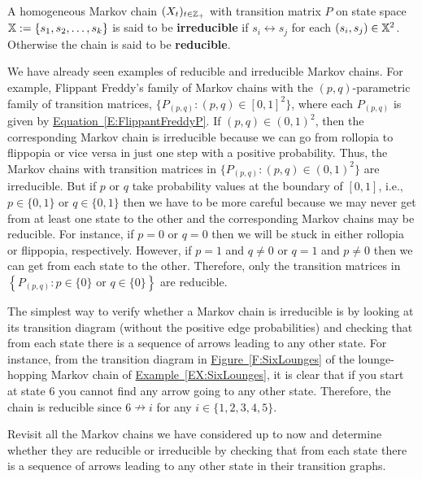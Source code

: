 \begin{definition}[Irreducible]\label{D:Irreducible}
A homogeneous Markov chain $(X_t)_{t\in\mathbb{Z}_+}$ with transition matrix $P$ on state space $\mathbb{X}:=\{s_1,s_2,\ldots,s_k\}$ is said to be {\bf irreducible} if $s_i \leftrightarrow s_j$ for each $(s_i,s_j) \in \mathbb{X}^2$.  Otherwise the chain is said to be {\bf reducible}.
\end{definition}

We have already seen examples of reducible and irreducible Markov chains.  For example, Flippant Freddy's family of Markov chains with the $(p,q)$-parametric family of transition matrices, $\{P_{(p,q)} : (p,q) \in [0,1]^2\}$, where each $P_{(p,q)}$ is given by \hyperref[E:FlippantFreddyP]{Equation~\ref*{E:FlippantFreddyP}}.  If $(p,q) \in (0,1)^2$, then the corresponding Markov chain is irreducible because we can go from rollopia to flippopia or vice versa in just one step with a positive probability.  Thus, the Markov chains with transition matrices in $\{P_{(p,q)} : (p,q) \in (0,1)^2\}$ are irreducible.  But if $p$ or $q$ take probability values at the boundary of $[0,1]$, i.e., $p \in \{0,1\}$ or $q \in \{0,1\}$ then we have to be more careful because we may  never get from at least one state to the other and the corresponding Markov chains may be reducible.   For instance, if $p=0$ or $q=0$ then we will be stuck in either rollopia or flippopia, respectively.  However, if $p=1$ and $q \neq 0$ or $q=1$ and $p \neq 0$ then we can get from each  state to the other.  Therefore,  only the transition matrices in $\left\{P_{(p,q)} : p \in \{0\} \text{ or } q \in \{0\}\right\}$ are reducible.

The simplest way to verify whether a Markov chain is irreducible is by looking at its transition diagram (without the positive edge probabilities) and checking that from each state there is a sequence of arrows leading to any other state.  For instance, from the transition diagram in \hyperref[F:SixLounges]{Figure~\ref*{F:SixLounges}} of the lounge-hopping Markov chain of \hyperref[EX:SixLounges]{Example~\ref*{EX:SixLounges}}, it is clear that if you start at state $6$ you cannot find any arrow going to any other state.  Therefore, the chain is reducible since $6 \nrightarrow i$ for any $i \in \{1,2,3,4,5\}$.

\begin{exercise}\label{EXR:ExsIrreducibleOrNot}
Revisit all the Markov chains we have considered up to now and determine whether they are reducible or irreducible by checking that from each state there is a sequence of arrows leading to any other state in their transition graphs.
\end{exercise}


